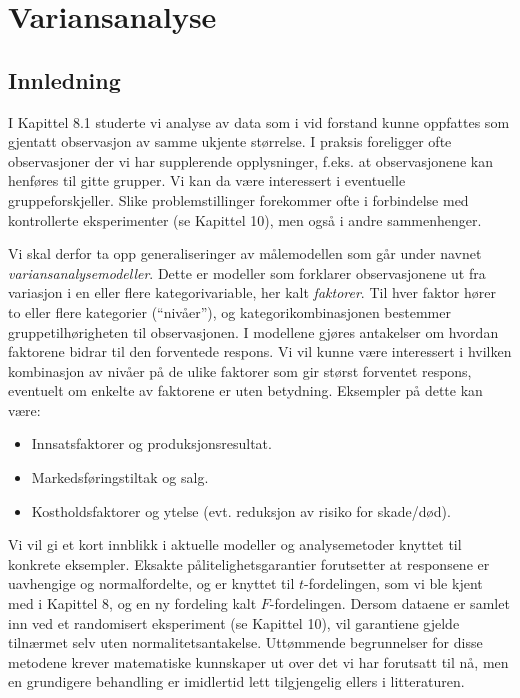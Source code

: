 \chapter{Variansanalyse}
\label{kap:variansanalyse} %

\section{Innledning}

I Kapittel 8.1 studerte vi analyse av data som i vid forstand kunne oppfattes
som gjentatt observasjon av samme ukjente størrelse.  I praksis foreligger
ofte observasjoner der vi har supplerende opplysninger, f.eks. at
observasjonene kan henføres til gitte grupper. Vi kan da være
interessert i eventuelle gruppeforskjeller. Slike problemstillinger
forekommer ofte i forbindelse med kontrollerte eksperimenter (se Kapittel 10),
men også i andre sammenhenger.

Vi skal derfor ta opp generaliseringer
av målemodellen som går under navnet {\em variansanalysemodeller}.
Dette er modeller som forklarer observasjonene ut fra variasjon i en
eller flere kategorivariable, her kalt {\em faktorer}.
Til hver faktor hører to eller flere kategorier (``nivåer''), og
kategorikombinasjonen bestemmer gruppetilhørigheten til observasjonen.
I modellene gjøres antakelser om hvordan faktorene bidrar til den forventede
respons. Vi vil kunne være interessert i hvilken kombinasjon av nivåer
på de ulike faktorer som gir størst forventet respons, eventuelt
om enkelte av faktorene er uten betydning.  Eksempler på dette
kan være:
\begin{itemize}
\item  Innsatsfaktorer og produksjonsresultat.
\item  Markedsføringstiltak og salg.
\item Kostholdsfaktorer og ytelse (evt. reduksjon av risiko for skade/død).
\end{itemize}

Vi vil gi et kort innblikk i aktuelle modeller og analysemetoder knyttet til 
konkrete eksempler. Eksakte pålitelighetsgarantier forutsetter at
respon\-sene er uavhengige og normalfordelte, og er knyttet til $t$-fordelingen,
som vi ble kjent med i Kapittel 8, og en ny fordeling kalt $F$-fordelingen.
Dersom dataene er samlet inn ved et randomisert eksperiment (se Kapittel 10),
vil garantiene gjelde tilnærmet selv uten normalitetsantakelse. 
Uttømmende begrunnelser for disse metodene krever matematiske kunnskaper
ut over det vi har forutsatt til nå, men en grundigere behandling er
imidlertid lett tilgjengelig ellers i litteraturen.

